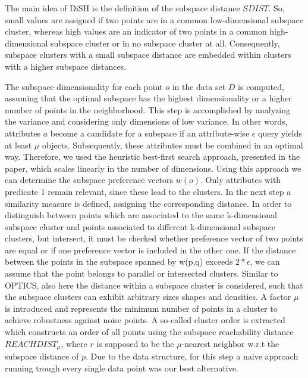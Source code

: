 \documentclass{article}
\begin{document}
The main idea of DiSH is the definition of the subspace distance $SDIST$. So, small values are assigned if two points are in a common low-dimensional subspace cluster, whereas high values are an indicator of two points in a common high-dimensional subspace cluster or in no subspace cluster at all. Consequently, subspace clusters with a small subspace distance are embedded within clusters with a higher subspace distances.\par

The subspace dimensionality for each point $o$ in the data set $D$ is computed, assuming that the optimal subspace has the highest dimensionality or a higher number of points in the neighborhood. This step is accomplished by analyzing the variance and considering only dimensions of low variance.  In other words, attributes $a$ become a candidate for a subspace if an attribute-wise $\epsilon$ query yields at least $\mu$ objects. Subsequently, these attributes must be combined in an optimal way. Therefore, we used the heuristic best-first search approach, presented in the paper, which scales linearly in the number of dimensions. Using this approach we can determine the subspace preference vectors $w(o)$. Only attributes with predicate 1 remain relevant, since these lead to the clusters. In the next step a similarity measure is defined, assigning the corresponding distance. In order to distinguish between points which are associated to the same k-dimensional subspace cluster and points associated to different k-dimensional subspace clusters, but intersect, it must be checked whether preference vector of two points are equal or if one preference vector is included in the other one. If the distance between the points in the subspace spanned by w(p,q) exceeds $2*\epsilon$, we can assume that the point belongs to parallel or intersected clusters. Similar to OPTICS, also here the distance within a subspace cluster is considered, such that the subspace clusters can exhibit arbitrary sizes shapes and densities. A factor $\mu$ is introduced and represents the minimum number of points in a cluster to achieve robustness against noise points. A so-called cluster order is extracted which constructs an order of all points using the subspace reachability distance $REACHDIST_\mu$, where $r$ is supposed to be the $\mu$-nearest neighbor w.r.t the subspace distance of $p$. Due to the data structure, for this step a naive approach running trough every single data point was our best alternative.\par  
\end{document}
